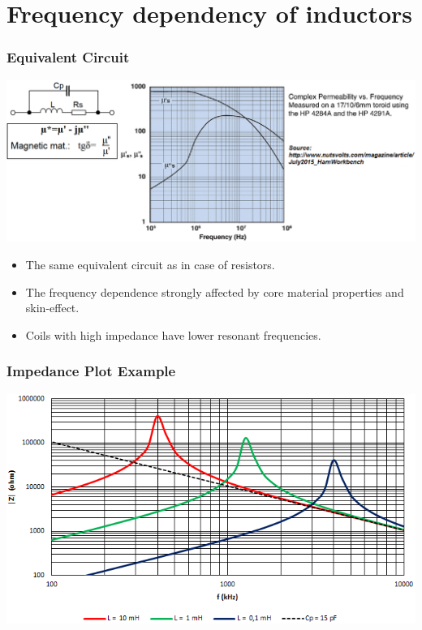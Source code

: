 \documentclass{beamer}
\begin{document}
\section{\texorpdfstring{Frequency dependency of inductors}{Frequency dependency of inductors}}
	\begin{frame}
    \frametitle{Equivalent Circuit}
		\begin{center}
		\includegraphics[scale=0.25]{obr10_ekvSchL2.png}
		\end{center}
    
		\begin{itemize}
			\item The same equivalent circuit as in case of resistors.
			\item The frequency dependence strongly affected by core material properties and skin-effect.
			\item Coils with high impedance have lower resonant frequencies.
		\end{itemize}
	\end{frame}
	\begin{frame}
    \frametitle{Impedance Plot Example}

		\begin{center}
			\includegraphics[scale=0.61]{obr04_impedanceL.png}
		\end{center}
	\end{frame}
\end{document}
